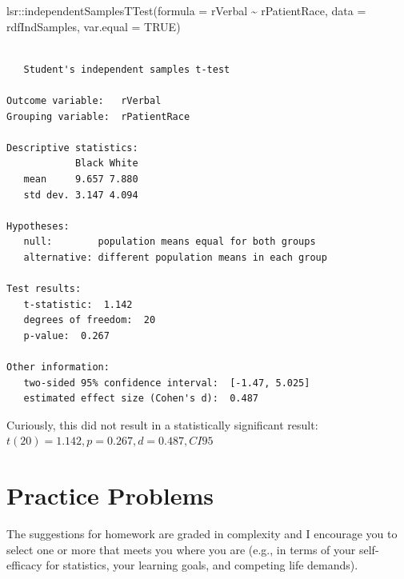 \documentclass[
  11pt,
]{book}
\newenvironment{Shaded}{\begin{snugshade}}{\end{snugshade}}
\newcommand{\AttributeTok}[1]{\textcolor[rgb]{0.77,0.63,0.00}{#1}}
\newcommand{\ConstantTok}[1]{\textcolor[rgb]{0.00,0.00,0.00}{#1}}
\newcommand{\FunctionTok}[1]{\textcolor[rgb]{0.00,0.00,0.00}{#1}}
\newcommand{\NormalTok}[1]{#1}
\newcommand{\OtherTok}[1]{\textcolor[rgb]{0.56,0.35,0.01}{#1}}
\newcommand{\SpecialCharTok}[1]{\textcolor[rgb]{0.00,0.00,0.00}{#1}}
\newcommand{\StringTok}[1]{\textcolor[rgb]{0.31,0.60,0.02}{#1}}
\begin{document}
\begin{Shaded}
\end{Shaded}

\begin{Shaded}
\begin{Highlighting}[]
\NormalTok{lsr}\SpecialCharTok{::}\FunctionTok{independentSamplesTTest}\NormalTok{(}\AttributeTok{formula =}\NormalTok{ rVerbal }\SpecialCharTok{\textasciitilde{}}\NormalTok{ rPatientRace, }\AttributeTok{data =}\NormalTok{ rdfIndSamples,}
    \AttributeTok{var.equal =} \ConstantTok{TRUE}\NormalTok{)}
\end{Highlighting}
\end{Shaded}

\begin{verbatim}

   Student's independent samples t-test 

Outcome variable:   rVerbal 
Grouping variable:  rPatientRace 

Descriptive statistics: 
            Black White
   mean     9.657 7.880
   std dev. 3.147 4.094

Hypotheses: 
   null:        population means equal for both groups
   alternative: different population means in each group

Test results: 
   t-statistic:  1.142 
   degrees of freedom:  20 
   p-value:  0.267 

Other information: 
   two-sided 95% confidence interval:  [-1.47, 5.025] 
   estimated effect size (Cohen's d):  0.487 
\end{verbatim}

Curiously, this did not result in a statistically significant result: \(t(20) = 1.142, p = 0.267, d = 0.487, CI95%
\)

\hypertarget{practice-problems-2}{%
\section{Practice Problems}\label{practice-problems-2}}

The suggestions for homework are graded in complexity and I encourage you to select one or more that meets you where you are (e.g., in terms of your self-efficacy for statistics, your learning goals, and competing life demands).
\end{document}
